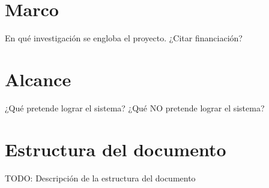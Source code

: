 \section{Marco}

En qué investigación se engloba el proyecto. ¿Citar financiación?

\section{Alcance}

¿Qué pretende lograr el sistema?
¿Qué NO pretende lograr el sistema?

\section{Estructura del documento}

TODO: Descripción de la estructura del documento